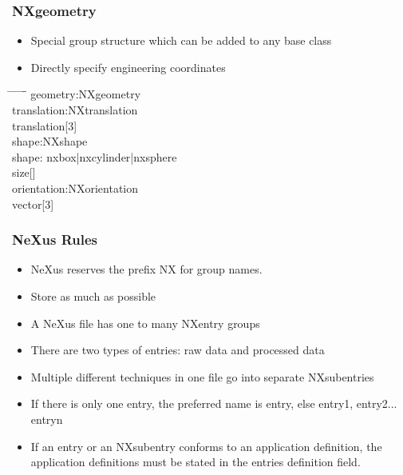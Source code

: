 \documentclass{beamer}
\begin{document}
\begin{frame} \frametitle{NXgeometry}
\begin{itemize}
\item Special group structure which can be added to any base class
\item Directly specify engineering coordinates
\end{itemize}
\begin{tabbing}
\hspace*{1cm} \= \hspace*{1cm} \= \hspace*{1cm} \= \hspace*{1cm} \= \hspace*{1cm} \= \hspace*{1cm}\= \kill
geometry:NXgeometry \\
 \>translation:NXtranslation \\
\> \>translation[3]\\
\>shape:NXshape\\
\> \>shape: nxbox|nxcylinder|nxsphere\\
\> \>size[]\\
\>orientation:NXorientation\\
\> \>vector[3]\\
\end{tabbing}
\end{frame}




\begin{frame}
\frametitle{NeXus Rules}
\begin{itemize}
\item NeXus reserves the prefix NX for group names.  
\item Store as much as possible
\item A NeXus file has one to many NXentry groups 
\item There are two types of entries: raw data and processed data
\item Multiple different techniques in one file go into separate NXsubentries
\item If there is only one entry, the preferred name is entry, else entry1, entry2... entryn
\item If an entry or an NXsubentry conforms to an application definition, 
 the application definitions must be stated in the 
 entries definition field.
\end{itemize}
\end{frame}
\end{document}
